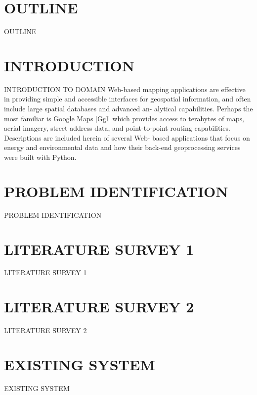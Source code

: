 \documentclass[svgnames,9pt]{beamer}
\begin{document}
\section{OUTLINE}
\begin{frame}{OUTLINE}
        \tableofcontents
\end{frame}
\section{INTRODUCTION}
\begin{frame}{INTRODUCTION TO DOMAIN}
Web-based mapping applications are effective in providing
simple and accessible interfaces for geospatial information,
and often include large spatial databases and advanced an-
alytical capabilities. Perhaps the most familiar is Google
Maps [Ggl] which provides access to terabytes of maps,
aerial imagery, street address data, and point-to-point routing
capabilities. Descriptions are included herein of several Web-
based applications that focus on energy and environmental data
and how their back-end geoprocessing services were built with
Python.
\end{frame}

\section{PROBLEM IDENTIFICATION}
\begin{frame}
{PROBLEM IDENTIFICATION}
\end{frame}
\section{LITERATURE SURVEY 1}
\begin{frame}{LITERATURE SURVEY 1}

\end{frame}
\section{LITERATURE SURVEY 2}
\begin{frame}{LITERATURE SURVEY 2}


\end{frame}
\section{EXISTING SYSTEM}
\begin{frame}{EXISTING SYSTEM}

\end{frame}
\end{document}
